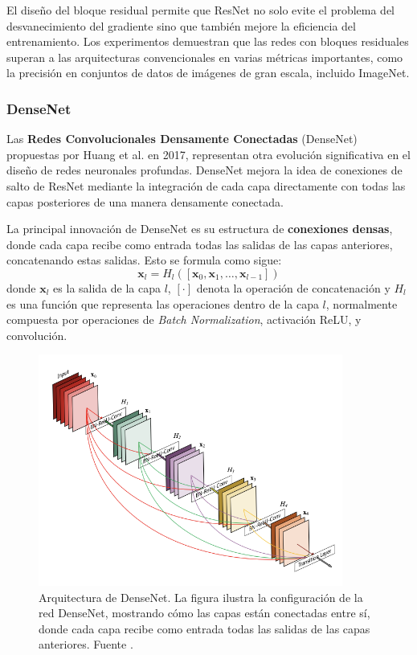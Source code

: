 El diseño del bloque residual permite que ResNet no solo evite el problema del desvanecimiento del gradiente sino que también mejore la eficiencia del entrenamiento. Los experimentos demuestran que las redes con bloques residuales superan a las arquitecturas convencionales en varias métricas importantes, como la precisión en conjuntos de datos de imágenes de gran escala, incluido ImageNet.

\subsubsection{DenseNet}

Las \textbf{Redes Convolucionales Densamente Conectadas} (DenseNet) propuestas por Huang et al. en 2017, representan otra evolución significativa en el diseño de redes neuronales profundas. DenseNet mejora la idea de conexiones de salto de ResNet mediante la integración de cada capa directamente con todas las capas posteriores de una manera densamente conectada.

La principal innovación de DenseNet es su estructura de \textbf{conexiones densas}, donde cada capa recibe como entrada todas las salidas de las capas anteriores, concatenando estas salidas. Esto se formula como sigue:
\begin{equation}
	\mathbf{x}_l = H_{l}([\mathbf{x}_0, \mathbf{x}_1, \dots, \mathbf{x}_{l-1}])
\end{equation}
donde \(\mathbf{x}_l\) es la salida de la capa \(l\), \([ \cdot ]\) denota la operación de concatenación y \(H_l\) es una función que representa las operaciones dentro de la capa \(l\), normalmente compuesta por operaciones de \textit{Batch Normalization}, activación ReLU, y convolución.

\begin{figure}
	\label{key}
	\centering
	\includegraphics[width=100mm]{img/densenet.png}
	\caption{Arquitectura de DenseNet. La figura ilustra la configuración de la red DenseNet, mostrando cómo las capas están conectadas entre sí, donde cada capa recibe como entrada todas las salidas de las capas anteriores. Fuente \cite{huang2017densely}.}
\end{figure}

